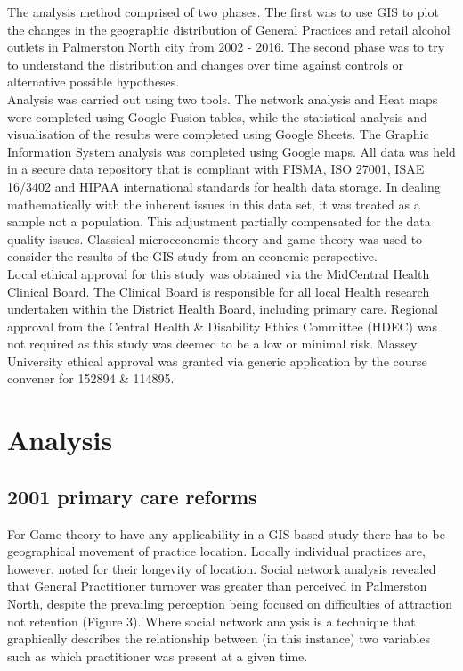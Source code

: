 \documentclass[11pt,a4paper]{article}
\begin{document}
The analysis method comprised of two phases. The first was to use GIS to plot the changes in the geographic distribution of General Practices and retail alcohol outlets in Palmerston North city from 2002 - 2016. The second phase was to try to understand the distribution and changes over time against controls or alternative possible hypotheses. \\

Analysis was carried out using two tools. The network analysis and Heat maps were completed using Google Fusion tables, while the statistical analysis and visualisation of the results were completed using Google Sheets. The Graphic Information System analysis was completed using Google maps. All data was held in a secure data repository that is compliant with FISMA, ISO 27001, ISAE 16/3402 and HIPAA international standards for health data storage. In dealing mathematically  with the inherent issues in this data set, it was treated as a sample not a population. This adjustment partially compensated for the data quality issues. Classical microeconomic theory and game theory was used to consider the results of the GIS study from an economic perspective. \\

Local ethical approval for this study was obtained via the MidCentral Health Clinical Board. The Clinical Board is responsible for all local Health research undertaken within the District Health Board, including primary care.  Regional approval from the Central Health \& Disability Ethics Committee (HDEC) was not required as this study was deemed to be  a low or minimal risk. Massey University ethical approval was granted via generic application by the course convener for 152894 \& 114895. \\

\section{Analysis}
\subsection{2001 primary care reforms}
For Game theory to have any applicability in a GIS based study there has to be geographical movement of practice location. Locally individual practices are, however,  noted for their longevity of location. Social network analysis revealed that General Practitioner turnover was greater than perceived in Palmerston North, despite the prevailing perception being focused on difficulties of attraction not retention (Figure 3). Where social network analysis is a technique that graphically describes the relationship between (in this instance) two variables such as which practitioner was present at a given time.\\
\end{document}
